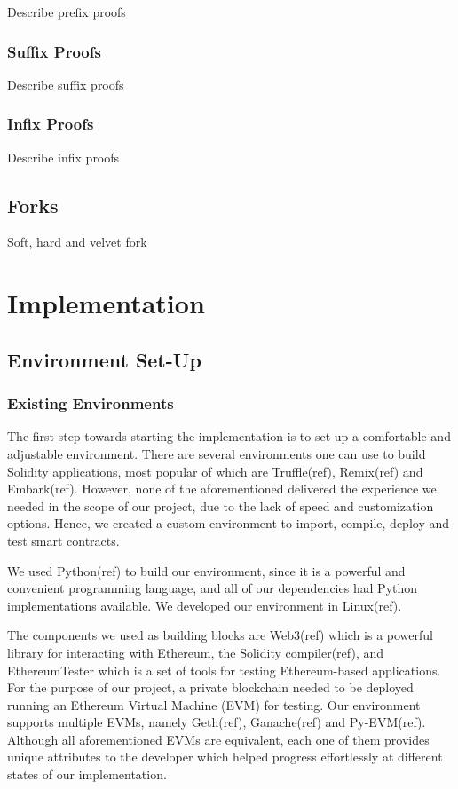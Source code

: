 \documentclass{article}
\begin{document}
  Describe prefix proofs

  \subsubsection{Suffix Proofs}

  Describe suffix proofs

  \subsubsection{Infix Proofs}

  Describe infix proofs

  \subsection{Forks}

  Soft, hard and velvet fork

  \pagebreak

  \section{Implementation}

  \subsection{Environment Set-Up}

  \subsubsection{Existing Environments}

  The first step towards starting the implementation is to set up a
  comfortable and adjustable environment. There are several environments
  one can use to build Solidity applications, most popular of which are
  Truffle(ref), Remix(ref) and Embark(ref). However, none of the
  aforementioned delivered the experience we needed in the scope of our
  project, due to the lack of speed and customization options. Hence, we
  created a custom environment to import, compile, deploy and test smart
  contracts.

  We used Python(ref) to build our environment, since it is a powerful
  and convenient programming language, and all of our dependencies had
  Python implementations available. We developed our environment in
  Linux(ref).

  The components we used as building blocks are Web3(ref) which is a
  powerful library for interacting with Ethereum, the Solidity
  compiler(ref), and EthereumTester which is a set of tools for testing
  Ethereum-based applications. For the purpose of our project, a private
  blockchain needed to be deployed running an Ethereum Virtual Machine
  (EVM) for testing. Our environment supports multiple EVMs, namely
  Geth(ref), Ganache(ref) and Py-EVM(ref). Although all aforementioned
  EVMs are equivalent, each one of them provides unique attributes to
  the developer which helped progress effortlessly at different states
  of our implementation.
\end{document}
